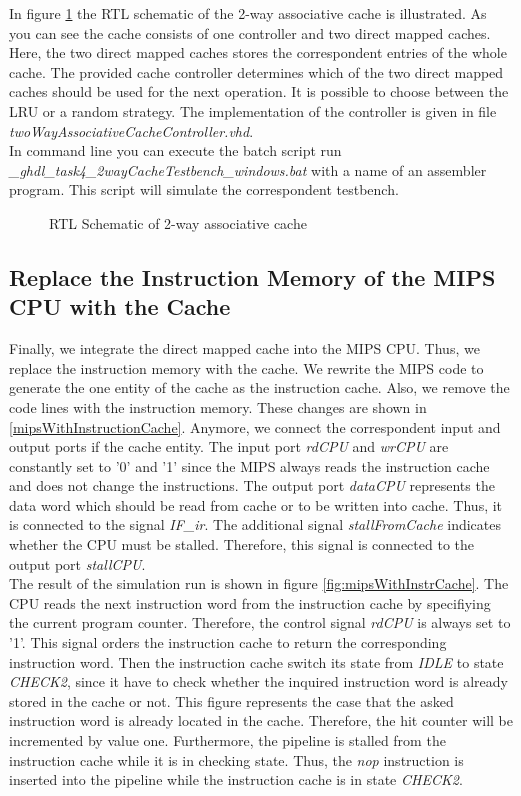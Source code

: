 In figure \ref{fig:rtl2wayCache} the RTL schematic of the 2-way associative cache is illustrated. As you can see the cache consists of one controller and two direct mapped caches. Here, the two direct mapped caches stores the correspondent entries of the whole cache. The provided cache controller determines which of the two direct mapped caches should be used for the next operation. It is possible to choose between the LRU or a random strategy. The implementation of the controller is given in file \textit{twoWayAssociativeCacheController.vhd}.\\
In command line you can execute the batch script run \textit{\_ghdl\_task4\_2wayCacheTestbench\_windows.bat} with a name of an assembler program. This script will simulate the correspondent testbench.
\newpage
\begin{figure}[h!]
   	
	\centering
	\caption{RTL Schematic of 2-way associative cache}
	\label{fig:rtl2wayCache}
\end{figure}
\newpage
\subsection{Replace the Instruction Memory of the MIPS CPU with the Cache}
\label{sec:replaceInstructionMemory}
Finally, we integrate the direct mapped cache into the MIPS CPU. Thus, we replace the instruction memory with the cache. We rewrite the MIPS code to generate the one entity of the cache as the instruction cache. Also, we remove the code lines with the instruction memory. These changes are shown in \ref{mipsWithInstructionCache}. Anymore, we connect the correspondent input and output ports if the cache entity. The input port \textit{rdCPU} and \textit{wrCPU} are constantly set to '0' and '1' since the MIPS always reads the instruction cache and does not change the instructions. The output port \textit{dataCPU} represents the data word which should be read from cache or to be written into cache. Thus, it is connected to the signal \textit{IF\_ir}. The additional signal \textit{stallFromCache} indicates whether the CPU must be stalled. Therefore, this signal is connected to the output port \textit{stallCPU}.\\
The result of the simulation run is shown in figure \ref{fig:mipsWithInstrCache}. The CPU reads the next instruction word from the instruction cache by specifiying the current program counter. Therefore, the control signal \textit{rdCPU} is always set to '1'. This signal orders the instruction cache to return the corresponding instruction word. Then the instruction cache switch its state from \textit{IDLE} to state \textit{CHECK2}, since it have to check whether the inquired instruction word is already stored in the cache or not. This figure represents the case that the asked instruction word is already located in the cache. Therefore, the hit counter will be incremented by value one. Furthermore, the pipeline is stalled from the instruction cache while it is in checking state. Thus, the \textit{nop} instruction is inserted into the pipeline while the instruction cache is in state \textit{CHECK2}.


